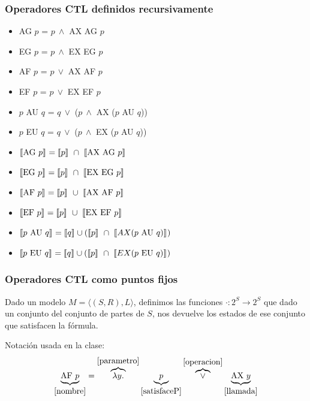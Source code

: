 \subsubsection{Operadores CTL definidos recursivamente}\label{sub::puntoFijoRecursivo}
\begin{multicols}{2}
\begin{itemize}

\item AG $p$ = $p~\land$ AX AG $p$
\item EG $p$ = $p~\land$ EX EG $p$
\item AF $p$ = $p~\lor$  AX AF $p$
\item EF $p$ = $p~\lor$  EX EF $p$
\item $p$ AU $q$ = $q~\lor$ ($p~\land$ AX ($p$ AU $q$))
\item $p$ EU $q$ = $q~\lor$ ($p~\land$ EX ($p$ AU $q$))

\item $\llbracket \text{AG } p \rrbracket_{} =\llbracket p \rrbracket_{}~\cap~\llbracket \text{AX AG }p \rrbracket_{}$
\item $\llbracket \text{EG } p \rrbracket_{} =\llbracket p \rrbracket_{}~\cap~\llbracket \text{EX EG }p \rrbracket_{}$
\item $\llbracket \text{AF } p \rrbracket_{} =\llbracket p \rrbracket_{}~\cup~\llbracket \text{AX AF }p \rrbracket_{}$
\item $\llbracket \text{EF } p \rrbracket_{} =\llbracket p \rrbracket_{}~\cup~\llbracket \text{EX EF }p \rrbracket_{}$
\item $\llbracket p\text{ AU } q \rrbracket_{} =\llbracket q \rrbracket_{} \cup (\llbracket p \rrbracket_{}~\cap~\llbracket AX(p\text{ AU } q) \rrbracket_{})$
\item $\llbracket p\text{ EU } q \rrbracket_{} =\llbracket q \rrbracket_{} \cup (\llbracket p \rrbracket_{}~\cap~\llbracket EX(p\text{ EU } q) \rrbracket_{})$

\end{itemize}

\end{multicols}

\subsubsection{Operadores CTL como puntos fijos}
Dado un modelo $M=\langle(S,R), L\rangle$, definimos las funciones $\cdot:2^S\to 2^S$ que dado un conjunto del conjunto de partes de $S$, nos devuelve los estados de ese conjunto que satisfacen la fórmula. 

Notación usada en la clase: $$\underbrace{\text{AF } p}_{\ref{nombre}} = \overbrace{\lambda y.}^{\ref{parametro}} \underbrace{p}_{\ref{satisfaceP}}\overbrace{\lor }^{\ref{operacion}}\underbrace{\text{AX } y}_{\ref{llamada}}$$


